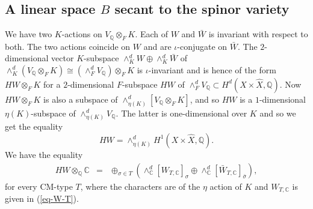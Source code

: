 \documentclass[12pt]{amsart}
\newcommand{\hide}[1]{}
\numberwithin{equation}{subsection}
\theoremstyle{plain}
\theoremstyle{definition}
\newcommand{\CC}{{\mathbb C}}
\newcommand{\QQ}{{\mathbb Q}}
\newcommand{\RR}{{\mathbb R}}
\newcommand{\PP}{{\mathbb P}}
\begin{document}
{\subsection{A linear space $B$ secant to the spinor variety}
We have two $K$-actions on $V_\QQ\otimes_FK$. Each of $W$ and $\bar{W}$ is invariant with respect to both. The two actions coincide on $W$ and are $\iota$-conjugate on $\bar{W}$.
The $2$-dimensional  vector $K$-subspace $\wedge^d_KW\oplus\wedge^d_K\bar{W}$ of $\wedge^d_K(V_\QQ\otimes_FK)\cong(\wedge^d_F V_\QQ)\otimes_FK$
is $\iota$-invariant and is hence of the form $HW\otimes_FK$ for a $2$-dimensional $F$-subspace $HW$ of
$\wedge^d_FV_\QQ\subset H^d(X\times\hat{X},\QQ)$. Now $HW\otimes_FK$ is also a subspace of $\wedge^d_{\eta(K)}[V_\QQ\otimes_FK]$, and so 
$HW$ is a $1$-dimensional $\eta(K)$-subspace of $\wedge^d_{\eta(K)}V_\QQ$. The latter is one-dimensional over $K$ and so we get the equality  
\[
HW=\wedge^d_{\eta(K)}H^1(X\times\hat{X},\QQ).
\] 
We have the equality
\begin{eqnarray*}
HW\otimes_\QQ\CC&=&\oplus_{\sigma\in T} \left(
\wedge^d_\CC[W_{T,\CC}]_\sigma \oplus \wedge^d_\CC[\bar{W}_{T,\CC}]_{\bar{\sigma}}
\right),
\end{eqnarray*}
for every CM-type $T$, where 
the characters are of the $\eta$ action of $K$
and $W_{T,\CC}$ is given in (\ref{eq-W-T}).



\hide{
% 
}}
\end{document}
